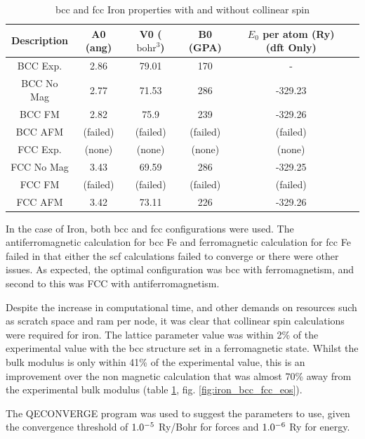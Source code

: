 \begin{table}[h]
\begin{center}
\renewcommand{\arraystretch}{1.2}
\begin{tabular}{c c c c c c}
\hline\hline
Description & A0 (ang) & V0 ($\text{bohr}^3$) & B0 (GPA) & $E_0$ per atom (Ry) (\acrshort{dft} Only) \\
\hline\hline
BCC Exp. & 2.86 & 79.01 & 170 & - \\
BCC No Mag & 2.77 & 71.53 & 286 & -329.23 \\
BCC FM & 2.82 & 75.9 & 239 & -329.26 \\
BCC AFM & (failed) & (failed) & (failed) & (failed) \\
FCC Exp. & (none) & (none) & (none) & (none) \\
FCC No Mag & 3.43 & 69.59 & 286 & -329.25 \\
FCC FM & (failed) & (failed) & (failed) & (failed) \\
FCC AFM & 3.42 & 73.11 & 226 & -329.26 \\
\hline\hline
\end{tabular}
\end{center}
\caption{\acrshort{bcc} and \acrshort{fcc} Iron properties with and without collinear spin}
\label{table:feproperties}
\end{table}

In the case of Iron, both \acrshort{bcc} and \acrshort{fcc} configurations were used.  The antiferromagnetic calculation for \acrshort{bcc} \Gls{Fe} and ferromagnetic calculation for \acrshort{fcc} \Gls{Fe} failed in that either the \acrshort{scf} calculations failed to converge or there were other issues.  As expected, the optimal configuration was \acrshort{bcc} with ferromagnetism, and second to this was FCC with antiferromagnetism.

Despite the increase in computational time, and other demands on resources such as scratch space and \acrshort{ram} per node, it was clear that collinear spin calculations were required for iron.  The lattice parameter value was within 2\% of the experimental value with the \acrshort{bcc} structure set in a ferromagnetic state.  Whilst the bulk modulus is only within 41\% of the experimental value, this is an improvement over the non magnetic calculation that was almost 70\% away from the experimental bulk modulus (table \ref{table:feproperties}, fig. \ref{fig:iron_bcc_fcc_eos}).


The QECONVERGE program was used to suggest the parameters to use, given the convergence threshold of $1.0 \time 10^{-5}$ Ry/Bohr for forces and $1.0 \time 10^{-6}$ Ry for energy.

